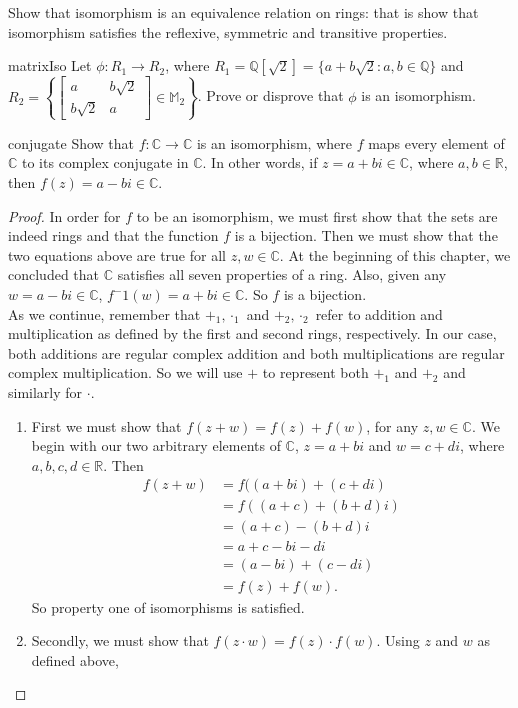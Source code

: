 \begin{exercise}{}
Show that isomorphism is an equivalence relation on rings: that is show that isomorphism satisfies the reflexive, symmetric and transitive properties.
\end{exercise}

\begin{exercise}{matrixIso}
Let $\phi: R_1\rightarrow R_2$, where $R_1={\mathbb Q}[\sqrt{2}]=\{a+b\sqrt{2}:  a,b\in{\mathbb Q}\}$ and $R_2=\left\{
\begin{bmatrix}
a & b \sqrt{2}\\
b \sqrt{2} & a
\end{bmatrix}
\in{\mathbb M}_2\right\}$.  Prove or disprove that $\phi$ is an isomorphism.
\end{exercise}

\begin{example}{conjugate}
Show that $f:{\mathbb C}\rightarrow{\mathbb C}$ is an isomorphism, where $f$ maps every element of ${\mathbb C}$ to its complex conjugate in ${\mathbb C}$.  In other words, if $z=a+bi\in{\mathbb C}$, where $a,b\in{\mathbb R}$, then $f(z)=a-bi\in{\mathbb C}$.

\begin{proof}{}
In order for $f$ to be an isomorphism, we must first show that the sets are indeed rings and that the function $f$ is a bijection.  Then we must show that the two equations above are true for all $z,w\in{\mathbb C}$.  At the beginning of this chapter, we concluded that ${\mathbb C}$ satisfies all seven properties of a ring.  Also, given any $w=a-bi\in{\mathbb C}$, $f^-1(w)=a+bi\in{\mathbb C}$.  So $f$ is a bijection.\\  
As we continue, remember that $+_1, \cdot_1$ and $+_2, \cdot_2$ refer to addition and multiplication as defined by the first and second rings, respectively.  In our case, both additions are regular complex addition and both multiplications are regular complex multiplication.  So we will use $+$ to represent both $+_1$ and $+_2$ and similarly for $\cdot$.
\begin{enumerate}[(1)]
\item First we must show that $f(z+w)=f(z)+f(w)$, for any $z,w\in{\mathbb C}$.  We begin with our two arbitrary elements of ${\mathbb C}$, $z=a+bi$ and $w=c+di$, where $a,b,c,d\in{\mathbb R}$.  Then 
\begin{align*}
f(z+w)&=f((a+bi)+(c+di)\\
&=f((a+c)+(b+d)i)\\
&=(a+c)-(b+d)i\\
&=a+c-bi-di\\
&=(a-bi)+(c-di)\\
&=f(z)+f(w).
\end{align*}
So property one of isomorphisms is satisfied.
\item Secondly, we must show that $f(z\cdot w)=f(z)\cdot f(w)$.  Using $z$ and $w$ as defined above,


\end{enumerate}
\end{proof}
\end{example}
